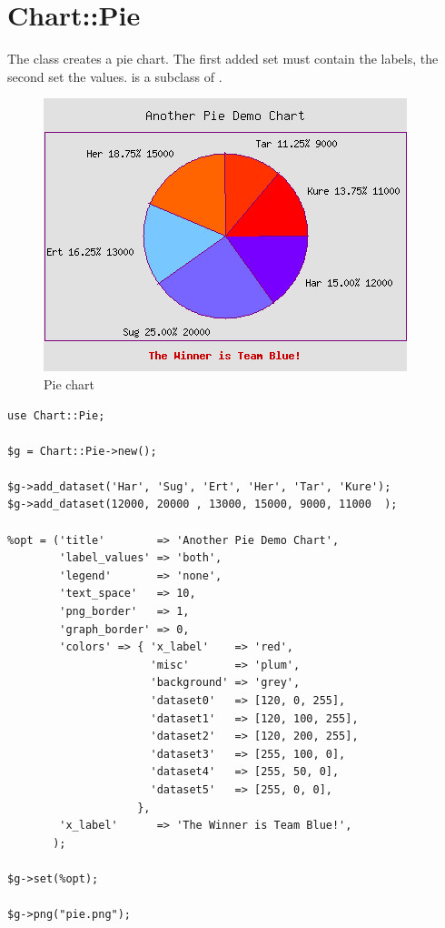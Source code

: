 %
%
\renewcommand{\thisname}{Chart::Pie}
\section{\thisname}
\name{\thisname}
\begin{Description}
The class \thisclass creates a pie chart. The first added set must
contain the labels, the second set the values. \thisclass is a subclass
of .
\end{Description}

\example
\begin{figure}[ht]
  \begin{center}
    \includegraphics[scale = 0.6]{d_pie3.png}
  \end{center}
  \caption{Pie chart}
  \label{fig:pie}
\end{figure}
\begin{verbatim}
use Chart::Pie;

$g = Chart::Pie->new();

$g->add_dataset('Har', 'Sug', 'Ert', 'Her', 'Tar', 'Kure');
$g->add_dataset(12000, 20000 , 13000, 15000, 9000, 11000  );

%opt = ('title'        => 'Another Pie Demo Chart',
        'label_values' => 'both',
        'legend'       => 'none',
        'text_space'   => 10,
        'png_border'   => 1,
        'graph_border' => 0,
        'colors' => { 'x_label'    => 'red',
                      'misc'       => 'plum',
                      'background' => 'grey',
                      'dataset0'   => [120, 0, 255],
                      'dataset1'   => [120, 100, 255],
                      'dataset2'   => [120, 200, 255],
                      'dataset3'   => [255, 100, 0],
                      'dataset4'   => [255, 50, 0],
                      'dataset5'   => [255, 0, 0],
                    },
        'x_label'      => 'The Winner is Team Blue!',
       );

$g->set(%opt);

$g->png("pie.png");
\end{verbatim}


